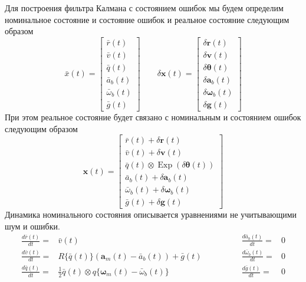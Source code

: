 \documentclass[12pt]{article}
\begin{document}
Для построения фильтра Калмана с состоянием ошибок мы будем определим
номинальное состояние и состояние ошибок и реальное состояние следующим образом
\begin{equation}
    \bar{x}(t)=\begin{bmatrix}
        \bar{r}(t)   \\ \bar{v}(t) \\ \bar{q}(t) \\
        \bar{a}_b(t) \\ \bar{\omega}_b(t) \\ \bar{g}(t)
    \end{bmatrix}
    \qquad
    \delta \pmb{x}(t)=\begin{bmatrix}
        \delta \pmb{r}(t)   \\ \delta \pmb{v}(t) \\ \delta \pmb{\theta}(t) \\
        \delta \pmb{a}_b(t) \\ \delta \pmb{\omega}_b(t) \\ \delta \pmb{g}(t)
    \end{bmatrix}
\end{equation}
При этом реальное состояние будет связано с номинальным и состоянием ошибок следующим образом
\begin{equation}
    \pmb{x}(t)=\begin{bmatrix}
        \bar{r}(t) + \delta \pmb{r}(t)                              \\
        \bar{v}(t) + \delta \pmb{v}(t)                              \\
        \bar{q}(t)\otimes\operatorname{Exp}(\delta \pmb{\theta}(t)) \\
        \bar{a}_b(t) + \delta \pmb{a}_b(t)                          \\
        \bar{\omega}_b(t) + \delta \pmb{\omega}_b(t)                \\
        \bar{g}(t) + \delta \pmb{g}(t)
    \end{bmatrix}
\end{equation}
Динамика номинального состояния описывается уравнениями не учитывающими шум и ошибки.
\begin{equation}
    \begin{aligned}
        \frac{d \bar{r}(t)}{d t}= & \bar{v}(t)                                                 \\
        \frac{d \bar{v}(t)}{d t}= & R\{\bar{q}(t)\} (\pmb{a}_m(t) - \bar{a}_b(t)) + \bar{g}(t) \\
        \frac{d \bar{q}(t)}{d t}= & \frac{1}{2} \bar{q}(t) \otimes q\{
        \pmb{\omega}_m(t) - \bar{\omega}_b(t)
        \}                                                                                     \\
    \end{aligned}
    \qquad\qquad
    \begin{aligned}
        \frac{d \bar{a}_b(t)}{d t}=      & 0 \\
        \frac{d \bar{\omega}_b(t)}{d t}= & 0 \\
        \frac{d \bar{g}(t)}{d t}=        & 0 \\
    \end{aligned}
\end{equation}
\end{document}
